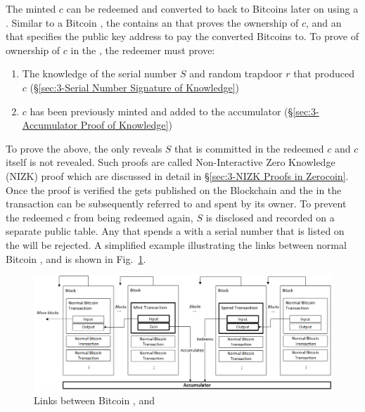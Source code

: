The minted \kwCoin{} $c$ can be redeemed and converted to back to Bitcoins later on using a . Similar to a Bitcoin \kwTransaction{}{}, the  contains an \kwInput{} that proves the ownership of $c$, and an \kwOutput{} that specifies the public key address to pay the converted Bitcoins to. To prove of ownership of $c$ in the , the redeemer must prove:

\begin{enumerate}
	\item The knowledge of the serial number $S$ and random trapdoor $r$ that produced $c$ (\S\ref{sec:3-Serial Number Signature of Knowledge})
	\item $c$ has been previously minted and added to the accumulator (\S\ref{sec:3-Accumulator Proof of Knowledge})
\end{enumerate}


To prove the above, the  only reveals $S$ that is committed in the redeemed $c$ and $c$ itself is not revealed. Such proofs are called Non-Interactive Zero Knowledge (NIZK) proof which are discussed in detail in \S\ref{sec:3-NIZK Proofs in Zerocoin}. Once the proof is verified the  gets published on the Blockchain and the \kwOutput{} in the transaction can be subsequently referred to and spent by its owner. To prevent the redeemed $c$ from being redeemed again, $S$ is disclosed and recorded on a separate public table. Any  that spends a \kwCoin{} with a serial number that is listed on the  will be rejected. A simplified example illustrating the links between normal Bitcoin ,  and  is shown in Fig.~\ref{fig:zerocoin_transactions}.

\begin{figure}[H]
	\begin{center}
		\includegraphics[scale=0.525]{zerocoin-transactions} 
		\caption{Links between Bitcoin ,  and }
		\label{fig:zerocoin_transactions} 
	\end{center}
\end{figure}

